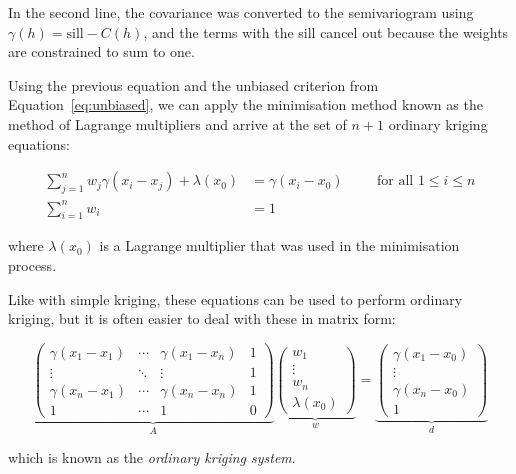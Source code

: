 In the second line, the covariance was converted to the semivariogram using \(\gamma(h) = \mathrm{sill} - C(h)\), and the terms with the sill cancel out because the weights are constrained to sum to one.

Using the previous equation and the unbiased criterion from Equation~\ref{eq:unbiased}, we can apply the minimisation method known as the method of Lagrange multipliers and arrive at the set of \(n+1\) ordinary kriging equations:

\begin{align}
\sum_{j=1}^n w_j \gamma(x_i-x_j) + \lambda(x_0) &= \gamma(x_i - x_0) \hspace{1cm} \text{for all } 1 \leq i \leq n \nonumber \\
\sum_{i=1}^n w_i &= 1 
\end{align}

where \(\lambda(x_0)\) is a Lagrange multiplier that was used in the minimisation process.

Like with simple kriging, these equations can be used to perform ordinary kriging, but it is often easier to deal with these in matrix form:

\begin{equation}
%
\underbrace{\left( \begin{array}{cccc}
\gamma(x_1-x_1) & \cdots & \gamma(x_1-x_n) & 1 \\
\vdots & \ddots & \vdots & 1 \\
\gamma(x_n-x_1) & \cdots & \gamma(x_n-x_n) & 1 \\
1 & \cdots & 1 & 0 \end{array} \right)}_{A}
%
\underbrace{\left(\begin{array}{c}
w_1 \\
\vdots \\
w_n \\
\lambda(x_0) \end{array} \right)}_{w} = 
%
\underbrace{\left(\begin{array}{c}
\gamma(x_1-x_0) \\
\vdots \\
\gamma(x_n-x_0) \\
1 \end{array} \right)}_{d}
\end{equation}

which is known as the \emph{ordinary kriging system}.

